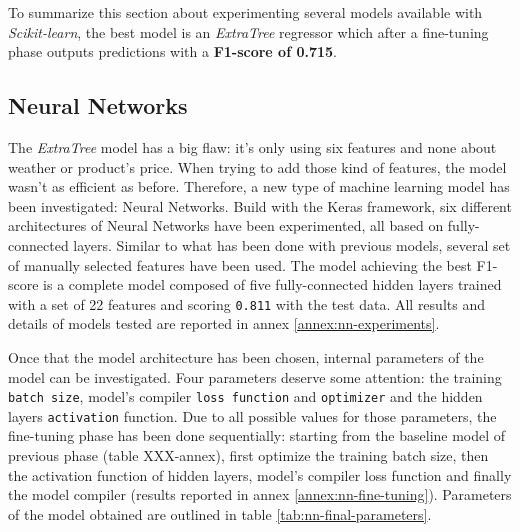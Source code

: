 To summarize this section about experimenting several models available with \textit{Scikit-learn}, the best model is an \textit{ExtraTree} regressor which after a fine-tuning phase outputs predictions with a \textbf{F1-score of 0.715}.

\subsection{Neural Networks}
The \textit{ExtraTree} model has a big flaw: it's only using six features and none about weather or product's price. When trying to add those kind of features, the model wasn't as efficient as before. Therefore, a new type of machine learning model has been investigated: Neural Networks. Build with the Keras framework, six different architectures of Neural Networks have been experimented, all based on fully-connected layers. Similar to what has been done with previous models, several set of manually selected features have been used. The model achieving the best F1-score is a complete model composed of five fully-connected hidden layers trained with a set of 22 features and scoring \texttt{0.811} with the test data. All results and details of models tested are reported in annex \ref{annex:nn-experiments}.

Once that the model architecture has been chosen, internal parameters of the model can be investigated. Four parameters deserve some attention: the training \texttt{batch size}, model's compiler \texttt{loss function} and \texttt{optimizer} and the hidden layers \texttt{activation} function. Due to all possible values for those parameters, the fine-tuning phase has been done sequentially: starting from the baseline model of previous phase (table XXX-annex), first optimize the training batch size, then the activation function of hidden layers, model's compiler loss function and finally the model compiler (results reported in annex \ref{annex:nn-fine-tuning}). Parameters of the model obtained are outlined in table \ref{tab:nn-final-parameters}.

